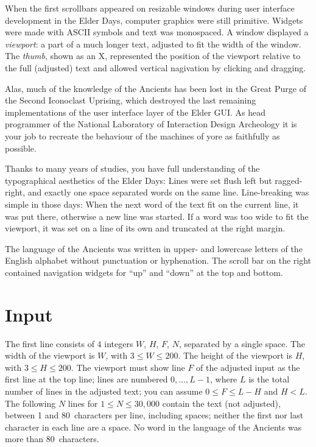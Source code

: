 

When the first scrollbars appeared on resizable windows during user interface development in the Elder Days, computer graphics were still primitive.
Widgets were made with ASCII symbols and text was monospaced.
A window displayed a \emph{viewport}: a part of a much longer text, adjusted to fit the width of the window.
The \emph{thumb}, shown as an X, represented the position of the viewport relative to the full (adjusted) text and allowed vertical nagivation by clicking and dragging.

Alas, much of the knowledge of the Ancients has been lost in the Great Purge of the Second Iconoclast Uprising, which destroyed the last remaining implementations of the user interface layer of the Elder GUI. 
As head programmer of the National Laboratory of Interaction Design Archeology it is your job to recreate the behaviour of the machines of yore as faithfully as possible.

Thanks to many years of studies, you have full understanding of the typographical aesthetics of the Elder Days:
Lines were set flush left but ragged-right, and exactly one space separated words on the same line. 
Line-breaking was simple in those days:
When the next word of the text fit on the current line, it was put there, otherwise a new line was started.
If a word was too wide to fit the viewport, it was set on a line of its own and truncated at the right margin.

The language of the Ancients was written in upper- and lowercase letters of the English alphabet without punctuation or hyphenation.
The scroll bar on the right contained navigation widgets for ``up'' and ``down'' at the top and bottom. 

\section*{Input}

The first line consists of $4$ integers $W$, $H$, $F$, $N$, separated by a single space.
The width of the viewport is $W$, with $3\leq W\leq 200$.
The height of the viewport is $H$, with $3\leq H\leq 200$.
The viewport must show line $F$ of the adjusted input as the first line at the top line; lines are numbered $0,\ldots, L-1$, where $L$ is the total number of lines in the adjusted text; you can assume $0\leq F \leq L - H$ and $H < L$.
The following $N$ lines for $1\leq N\leq 30,000$ contain the text (not adjusted), between 1 and 80~characters per line, including spaces; neither the first nor last character in each line are a space.
No word in the language of the Ancients was more than 80~characters.


